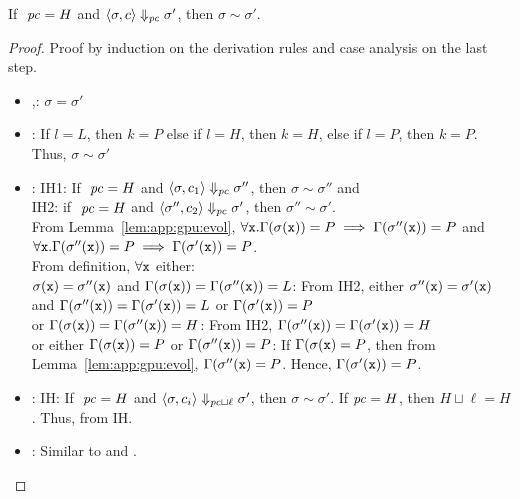 \begin{myLemma}
\label{lem:app:gpu:conf}
  If $~\mathit{pc} = H$ and $\langle \sigma, c \rangle
  \Downarrow_{\mathit{pc}} \sigma' $, then $\sigma \sim \sigma'$.
\end{myLemma}
\begin{proof} Proof by induction on the derivation rules and case
  analysis on the last step.
  \begin{itemize}
    \item {},: $\sigma = \sigma'$
    \item {}: If $l = L$, then $k = P$ else if $l=H$, then
      $k=H$, else if $l=P$, then $k=P$. Thus, $\sigma \sim \sigma'$
    \item {}: IH1: If $~\mathit{pc} = H$ and $\langle \sigma, c_1 \rangle
      \Downarrow_{\mathit{pc}} \sigma'' $, then $\sigma \sim \sigma''$ and \\
      IH2: if $~\mathit{pc} = H$ and $\langle \sigma'', c_2 \rangle
      \Downarrow_{\mathit{pc}} \sigma' $, then $\sigma'' \sim \sigma'$. \\
      From Lemma~\ref{lem:app:gpu:evol}, $\forall \texttt{x}. \Gamma(\sigma(\texttt{x}))
      = P \implies \Gamma(\sigma''(\texttt{x})) = P$ and $\forall \texttt{x}. \Gamma(\sigma''(\texttt{x}))
      = P \implies \Gamma(\sigma'(\texttt{x})) = P$. \\
      From definition, $\forall \texttt{x}$ either: \\
      $\sigma(\texttt{x}) = \sigma''(\texttt{x})$ and $\Gamma(\sigma(\texttt{x})) =
      \Gamma(\sigma''(\texttt{x})) = L$: 
      From IH2, either $\sigma''(\texttt{x}) = \sigma'(\texttt{x})$ and $\Gamma(\sigma''(\texttt{x})) =
      \Gamma(\sigma'(\texttt{x})) = L$ or $\Gamma(\sigma'(\texttt{x})) = P$ \\
      or $\Gamma(\sigma(\texttt{x})) = \Gamma(\sigma''(\texttt{x})) = H$: From IH2,
      $\Gamma(\sigma''(\texttt{x})) = \Gamma(\sigma'(\texttt{x})) = H$ \\
      or either $\Gamma(\sigma(\texttt{x})) = P$ or $\Gamma(\sigma''(\texttt{x})) = P$:
      If $\Gamma(\sigma(\texttt{x}) = P$, then from Lemma~\ref{lem:app:gpu:evol},
      $\Gamma(\sigma''(\texttt{x}) = P$. Hence, $\Gamma(\sigma'(\texttt{x})) = P$. 
    \item {}: IH: If $~\mathit{pc} = H$ and $\langle \sigma, c_i \rangle
      \Downarrow_{\mathit{pc} \sqcup \ell} \sigma' $, then $\sigma \sim
      \sigma'$. If $\mathit{pc} = H$, then $H \sqcup \ell  = H$. Thus, from IH.
    \item {}: Similar to  and .
  \end{itemize}
\end{proof}

